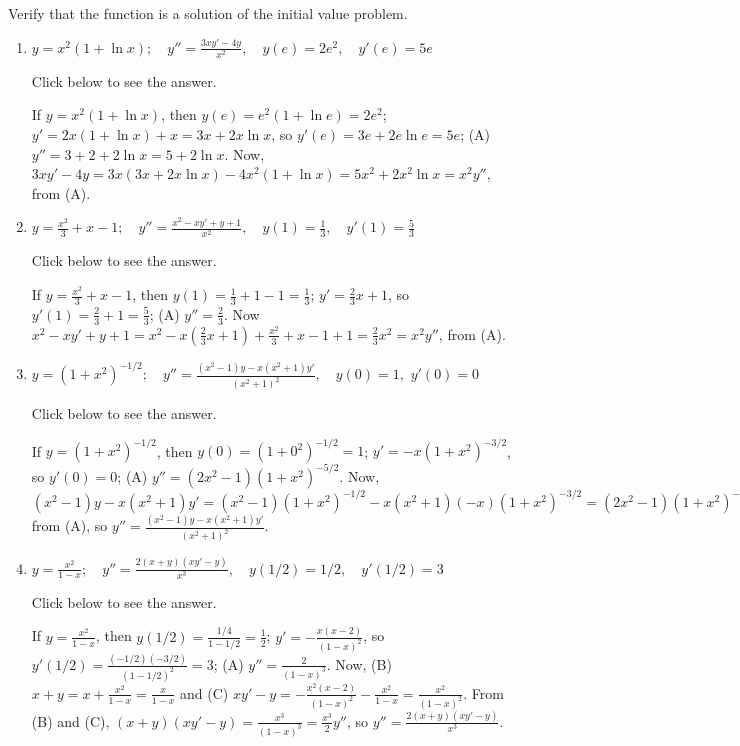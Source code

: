 \documentclass{ximera}
\begin{document}
\begin{problem}\label{exer:1.2.6}
Verify that the  function is a solution of
the initial value problem.

\begin{enumerate}
\item %
$y=x^2(1+\ln x);     \quad y''=\frac{3xy'-4y}{ x^2}, \quad
y(e)=2e^2, \quad y'(e)=5e$

Click below to see the answer.

\begin{expandable}
    If $y=x^2(1+\ln x)$, then $y(e)=e^2(1+\ln e)=2e^2$;
$y'=2x(1+\ln x)+x=3x+2x\ln x$, so $y'(e)=3e+2e\ln e=5e$; (A)
$y''=3+2+2\ln x=5+2\ln x$. Now, $3xy'-4y=3x(3x+2x\ln x)-4x^2(1+\ln
x)=5x^2+2x^2\ln x=x^2y''$, from (A).
\end{expandable}

\item %
$y=\frac{x^2}{3}+x-1;     \quad y''=\frac{x^2-xy'+y+1}{
x^2}, \quad y(1)=\frac{1}{3}, \quad y'(1)=\frac{5}{3}$

Click below to see the answer.

\begin{expandable}
    If $y=\frac{x^2}{3}+x-1$, then $y(1)=\frac{1}{3}+1-1=\frac{1}{3}$; $y'=\frac{2}{3}x+1$, so $y'(1)=\frac{2}{3}+1=\frac{5}{3}$; (A) $y''=\frac{2}{3}$. Now
$x^2-xy'+y+1=x^2- x\left(\frac{2}{3}x+1\right)+\frac{x^2}{3}+x-1+1=\frac{2}{3}x^2=x^2y''$, from (A).
\end{expandable}

\item %
$y=(1+x^2)^{-1/2};     \quad
y''=\frac{(x^2-1)y-x(x^2+1)y'}{ (x^2+1)^2}, \quad y(0)=1,$
$y'(0)=0$

Click below to see the answer.

\begin{expandable}
    If $y=(1+x^2)^{-1/2}$, then $y(0)=(1+0^2)^{-1/2}=1$;
$y'=-x(1+x^2)^{-3/2}$, so $y'(0)=0$; (A) $y''=(2x^2-1)(1+x^2)^{-5/2}$.
Now,
$(x^2-1)y-x(x^2+1)y'=(x^2-1)(1+x^2)^{-1/2}-x(x^2+1)(-x)(1+x^2)^{-3/2}
=(2x^2-1)(1+x^2)^{-1/2}=y''(1+x^2)^2$ from (A), so
$y''=\frac{(x^2-1)y-x(x^2+1)y'}{(x^2+1)^2}$.
\end{expandable}

\item %
$y=\frac{x^2}{ 1-x};    \quad y''=\frac{2(x+y)(xy'-y)}{ x^3},
\quad y(1/2)=1/2, \quad y'(1/2)=3$

Click below to see the answer.

\begin{expandable}
    If $y=\frac{x^2}{1-x}$, then $y(1/2)=\frac{1/4}{1-1/2}=\frac{1}{2}$; $y'=-\frac{x(x-2)}{(1-x)^2}$, so
$y'(1/2)=\frac{(-1/2)(-3/2)}{(1-1/2)^2}=3$; (A) $y''=\frac{2}{(1-x)^3}$. Now, (B) $x+y=x+\frac{x^2}{1-x}=\frac{x}{1-x}$ and (C)
$xy'-y=-\frac{x^2(x-2)}{(1-x)^2}-\frac{x^2}{1-x}=\frac{x^2}{(1-x)^2}$.
From (B) and (C), $(x+y)(xy'-y)=\frac{x^3}{(1-x)^3}=\frac{x^3}{2}y''$,
so $y''=\frac{2(x+y)(xy'-y)}{x^3}$.
\end{expandable}

\end{enumerate}

\end{problem}
\end{document}
